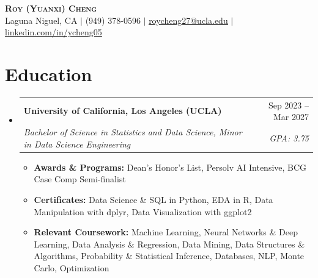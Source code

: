 \documentclass[letterpaper,11pt]{article}
\makeatletter
\newcommand{\resumeItem}[1]{
  \item\small{#1}
}
\newcommand{\resumeSubheading}[4]{
  \vspace{-2pt}\item
    \begin{tabular*}{\textwidth}[t]{l@{\extracolsep{\fill}}r}
      \textbf{#1} & #2 \\
      \textit{\small#3} & \textit{\small #4} \\
    \end{tabular*}\vspace{-7pt}
}
\newcommand{\resumeSubHeadingListStart}{\begin{itemize}[leftmargin=0in, label={}]}
\newcommand{\resumeSubHeadingListEnd}{\end{itemize}}
\newcommand{\resumeItemListStart}{\begin{itemize}[itemsep= 1.5pt, parsep=0pt]}
\newcommand{\resumeItemListEnd}{\end{itemize}\vspace{-5pt}}
\makeatother
\begin{document}
\begin{center}
    \textbf{\LARGE \scshape Roy (Yuanxi) Cheng} \\ \vspace{3pt}
    \small Laguna Niguel, CA $|$ (949) 378-0596 $|$
    \href{mailto:roycheng27@ucla.edu}{\underline{roycheng27@ucla.edu}} $|$
    \href{https://www.linkedin.com/in/ycheng05}{\underline{linkedin.com/in/ycheng05}}
\end{center}
\section{Education}
  \resumeSubHeadingListStart
    \resumeSubheading
      {University of California, Los Angeles (UCLA)}{Sep 2023 -- Mar 2027}
      {Bachelor of Science in Statistics and Data Science, Minor in Data Science Engineering}{GPA: 3.75}
      \resumeItemListStart
        \resumeItem{\textbf{Awards \& Programs:} Dean's Honor's List, Persolv AI Intensive, BCG Case Comp Semi-finalist}
        \resumeItem{\textbf{Certificates:} Data Science \& SQL in Python, EDA in R, Data Manipulation with dplyr, Data Visualization with ggplot2}
        \resumeItem{\textbf{Relevant Coursework:} Machine Learning, Neural Networks \& Deep Learning, Data Analysis \& Regression, Data Mining, Data Structures \& Algorithms, Probability \& Statistical Inference, Databases, NLP, Monte Carlo, Optimization}
      \resumeItemListEnd
  \resumeSubHeadingListEnd
\end{document}
